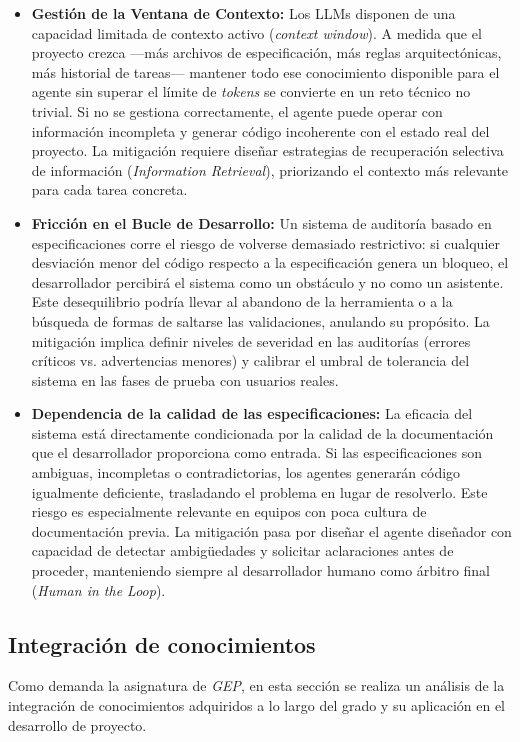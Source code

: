 \documentclass[11pt, letterpaper]{article}
\begin{document}
\begin{itemize}
    \item \textbf{Gestión de la Ventana de Contexto:} Los LLMs disponen de una capacidad limitada de contexto activo (\textit{context window}). A medida que el proyecto crezca —más archivos de especificación, más reglas arquitectónicas, más historial de tareas— mantener todo ese conocimiento disponible para el agente sin superar el límite de \textit{tokens} se convierte en un reto técnico no trivial. Si no se gestiona correctamente, el agente puede operar con información incompleta y generar código incoherente con el estado real del proyecto. La mitigación requiere diseñar estrategias de recuperación selectiva de información (\textit{Information Retrieval}), priorizando el contexto más relevante para cada tarea concreta.

    \item \textbf{Fricción en el Bucle de Desarrollo:} Un sistema de auditoría basado en especificaciones corre el riesgo de volverse demasiado restrictivo: si cualquier desviación menor del código respecto a la especificación genera un bloqueo, el desarrollador percibirá el sistema como un obstáculo y no como un asistente. Este desequilibrio podría llevar al abandono de la herramienta o a la búsqueda de formas de saltarse las validaciones, anulando su propósito. La mitigación implica definir niveles de severidad en las auditorías (errores críticos vs. advertencias menores) y calibrar el umbral de tolerancia del sistema en las fases de prueba con usuarios reales.

    \item \textbf{Dependencia de la calidad de las especificaciones:} La eficacia del sistema está directamente condicionada por la calidad de la documentación que el desarrollador proporciona como entrada. Si las especificaciones son ambiguas, incompletas o contradictorias, los agentes generarán código igualmente deficiente, trasladando el problema en lugar de resolverlo. Este riesgo es especialmente relevante en equipos con poca cultura de documentación previa. La mitigación pasa por diseñar el agente diseñador con capacidad de detectar ambigüedades y solicitar aclaraciones antes de proceder, manteniendo siempre al desarrollador humano como árbitro final (\textit{Human in the Loop}).
\end{itemize}


\subsection{Integración de conocimientos}
\label{sec:integracion_conocimientos}
Como demanda la asignatura de \textit{GEP}, en esta sección se realiza un análisis de la integración de conocimientos adquiridos a lo largo del grado y su aplicación en el desarrollo de proyecto.
\end{document}
